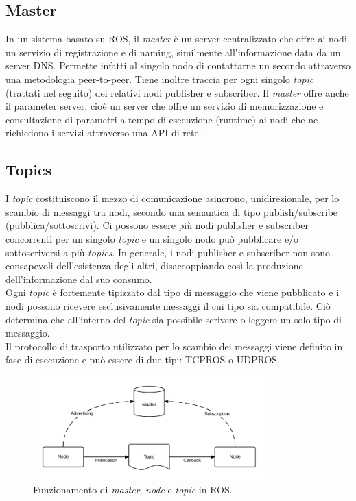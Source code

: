 \subsection{Master}
In un sistema basato su ROS, il \emph{master} è un server centralizzato che offre ai nodi un servizio di registrazione e di naming, similmente all’informazione data da un server \ac{DNS}. Permette infatti al singolo nodo di contattarne un secondo attraverso una metodologia peer-to-peer. Tiene inoltre traccia per ogni singolo \emph{topic} (trattati nel seguito) dei relativi nodi publisher e subscriber. Il \emph{master} offre anche il parameter server, cioè un server che offre un servizio di memorizzazione e consultazione di parametri a tempo di esecuzione (runtime) ai nodi che ne richiedono i servizi attraverso una \acs{API} di rete.
 
\subsection{Topics}
I \emph{topic} costituiscono il mezzo di comunicazione asincrono, unidirezionale, per lo scambio di messaggi tra nodi, secondo una semantica di tipo publish/subscribe (pubblica/sottoscrivi). Ci possono essere più nodi publisher e subscriber concorrenti per un singolo \emph{topic} e un singolo nodo può pubblicare e/o sottoscriversi a più \emph{topics}. In generale, i nodi publisher e subscriber non sono consapevoli dell’esistenza degli altri, disaccoppiando così la produzione dell’informazione dal suo consumo.\\

Ogni \emph{topic} è fortemente tipizzato dal tipo di messaggio che viene pubblicato e i nodi possono ricevere esclusivamente messaggi il cui tipo sia compatibile. Ciò determina che all’interno del \emph{topic} sia possibile scrivere o leggere un solo tipo di messaggio.\\

Il protocollo di trasporto utilizzato per lo scambio dei messaggi viene definito in fase di esecuzione e può essere di due tipi: TCPROS o UDPROS.

\begin{figure}[H]
    \centering
    \includegraphics[width=0.8\textwidth]{gfx/master_node_topic}
    \caption[Funzionamento di \emph{master}, \emph{node} e \emph{topic} in \acs{ROS}.]{Funzionamento di \emph{master}, \emph{node} e \emph{topic} in \acs{ROS}.}
    \label{fig:master_node_topic}
\end{figure}

